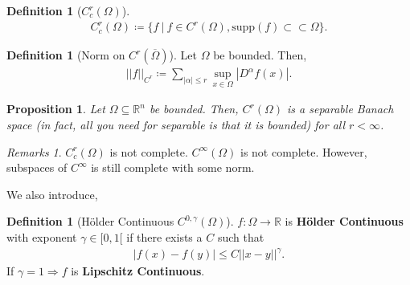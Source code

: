 \documentclass[psamsfonts]{amsart}
\newcommand{\given}{\ |\ }
\newtheorem{prop}[thm]{Proposition}
\theoremstyle{definition}
\newtheorem{defn}[thm]{Definition}
\theoremstyle{remark}
\newtheorem{rems}[thm]{Remarks}
\newcommand{\R}[0]{\mathbb{R}}
\numberwithin{equation}{section}
\begin{document}
\begin{defn}[\( C_c^r ( \Omega) \)]
	\begin{align}
		C_c^r(\Omega) \coloneqq \{ f \given f \in C^r(\Omega), \text{supp}(f) \subset \subset \Omega \}.	
	\end{align}
\end{defn}

\begin{defn}[Norm on \( C^r(\overline{\Omega}) \)]
		Let \( \Omega \) be bounded. Then, 
		\begin{align}
			\boxed{|| 
			f||_{C^r} \coloneqq \sum_{|\alpha|\leq r} \sup_{ x \in \Omega} |D^\alpha f(x)|.}	
		\end{align}
\end{defn}

\begin{prop}
Let \( \Omega \subseteq \R^n \) be bounded. Then, \( C^r(\Omega) \) is a separable Banach space
 (in fact, all you need for separable is that it is bounded) for all \( r < \infty \).
\end{prop}

\begin{rems}
	\( C_c^r(\Omega) \) is not complete. \( C^\infty (\Omega) \) is not complete. However, subspaces of \( C^\infty \) is still complete with some norm.
\end{rems}
We also introduce, 
\begin{defn}[Hölder Continuous \( C^{0, \gamma} (\Omega) \)]
	\( f: \Omega \rightarrow \R \) is \textbf{Hölder Continuous} with exponent \( \gamma \in [0, 1[ \) if there exists a \( C \) such that
	\begin{align}
		\boxed{| f(x) - f(y) | \leq C || x-y||^\gamma.	}
	\end{align}
	If \( \gamma =1 \Rightarrow  f \) is \textbf{Lipschitz Continuous}.
\end{defn}
\end{document}
